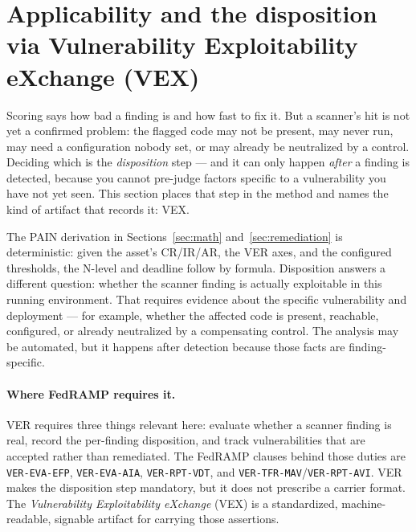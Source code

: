 \documentclass[11pt]{article}
\newcommand{\code}[1]{\texttt{#1}}
\begin{document}
\section{Applicability and the disposition via Vulnerability Exploitability eXchange (VEX)}
\label{sec:vex}
\begin{plain}
Scoring says how bad a finding is and how fast to fix it. But a scanner's hit is not
yet a confirmed problem: the flagged code may not be present, may never run, may need
a configuration nobody set, or may already be neutralized by a control. Deciding which
is the \emph{disposition} step --- and it can only happen \emph{after} a finding is
detected, because you cannot pre-judge factors specific to a vulnerability you have not
yet seen. This section places that step in the method and names the kind of artifact
that records it: VEX.
\end{plain}

The PAIN derivation in Sections~\ref{sec:math} and~\ref{sec:remediation} is
deterministic: given the asset's CR/IR/AR, the VER axes, and the configured
thresholds, the N-level and deadline follow by formula. Disposition answers a
different question: whether the scanner finding is actually exploitable in this
running environment. That requires evidence about the specific vulnerability and
deployment --- for example, whether the affected code is present, reachable,
configured, or already neutralized by a compensating control. The analysis may be
automated, but it happens after detection because those facts are finding-specific.

\paragraph{Where FedRAMP requires it.} VER requires three things relevant here:
evaluate whether a scanner finding is real, record the per-finding disposition, and
track vulnerabilities that are accepted rather than remediated. The FedRAMP clauses
behind those duties are \code{VER-EVA-EFP}, \code{VER-EVA-AIA},
\code{VER-RPT-VDT}, and \code{VER-TFR-MAV}/\code{VER-RPT-AVI}. VER makes the
disposition step mandatory, but it does not prescribe a carrier format. The
\emph{Vulnerability Exploitability eXchange} (VEX) is a standardized,
machine-readable, signable artifact for carrying those assertions.
\end{document}
